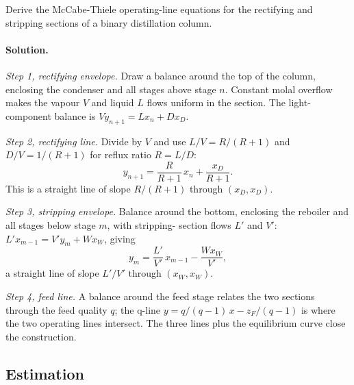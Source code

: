 \begin{exercise}
Derive the McCabe-Thiele operating-line equations for the rectifying
and stripping sections of a binary distillation column.

\paragraph{Solution.}
\textit{Step 1, rectifying envelope.} Draw a balance around the top of
the column, enclosing the condenser and all stages above stage $n$.
Constant molal overflow makes the vapour $V$ and liquid $L$ flows
uniform in the section. The light-component balance is $V y_{n+1} =
L x_n + D x_D$.

\textit{Step 2, rectifying line.} Divide by $V$ and use $L/V = R/(R+1)$
and $D/V = 1/(R+1)$ for reflux ratio $R = L/D$:
\[
y_{n+1} = \frac{R}{R+1}\,x_n + \frac{x_D}{R+1}.
\]
This is a straight line of slope $R/(R+1)$ through $(x_D, x_D)$.

\textit{Step 3, stripping envelope.} Balance around the bottom,
enclosing the reboiler and all stages below stage $m$, with stripping-
section flows $L'$ and $V'$: $L' x_{m-1} = V' y_m + W x_W$, giving
\[
y_m = \frac{L'}{V'}\,x_{m-1} - \frac{W x_W}{V'},
\]
a straight line of slope $L'/V'$ through $(x_W, x_W)$.

\textit{Step 4, feed line.} A balance around the feed stage relates the
two sections through the feed quality $q$; the q-line $y = q/(q-1)\,x -
z_F/(q-1)$ is where the two operating lines intersect. The three lines
plus the equilibrium curve close the construction.
\end{exercise}

\subsection*{Estimation}

